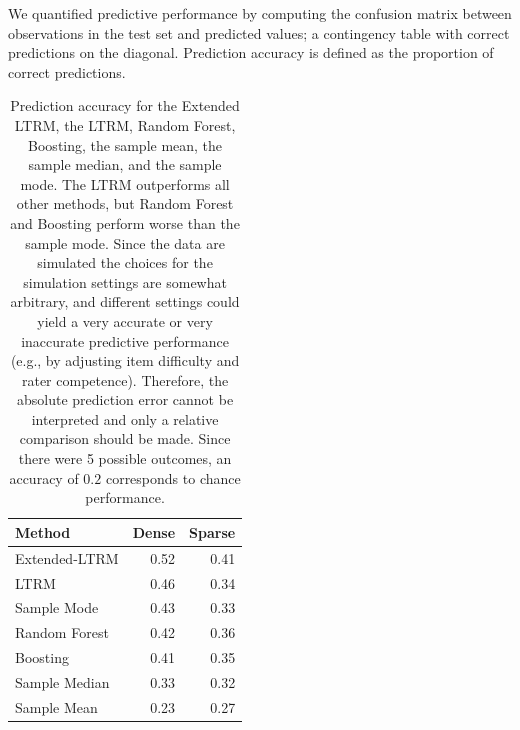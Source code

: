 \documentclass[a4paper,usenames,dvipsnames]{article}
\newenvironment{revision}{\color{teal}}{\color{black}}
\begin{document}
We quantified predictive performance by computing the confusion matrix between \begin{revision}observations in the test set\end{revision} and predicted values; a contingency table with correct predictions on the diagonal. Prediction accuracy is defined as the \begin{revision}proportion of correct predictions\end{revision}.

\begin{table}[ht]
	\centering
	\caption{Prediction accuracy for the \begin{revision}Extended LTRM, the\end{revision} LTRM, Random Forest, Boosting, \begin{revision}the sample mean, the sample median, \end{revision}and the sample mode. The LTRM outperforms all other methods, but Random Forest and Boosting perform worse than the sample mode. Since the data are simulated the choices for the simulation settings are somewhat arbitrary, and different settings could yield a very accurate or very inaccurate predictive performance (e.g., by adjusting item difficulty and rater competence). Therefore, the absolute prediction error cannot be interpreted and only a relative comparison should be made. Since there were 5 possible outcomes, an accuracy of $0.2$ corresponds to chance performance.}
	\begin{tabular}{lrr}
		\toprule
		Method & Dense & Sparse \\ 
		\midrule
		Extended-LTRM & 0.52 & 0.41 \\ 
		LTRM & 0.46 & 0.34 \\ 
		Sample Mode & 0.43 & 0.33 \\ 
		Random Forest & 0.42 & 0.36 \\ 
		Boosting & 0.41 & 0.35 \\ 
		Sample Median & 0.33 & 0.32 \\ 
		Sample Mean & 0.23 & 0.27 \\ 
		\bottomrule
	\end{tabular}
\end{table}
\end{document}
